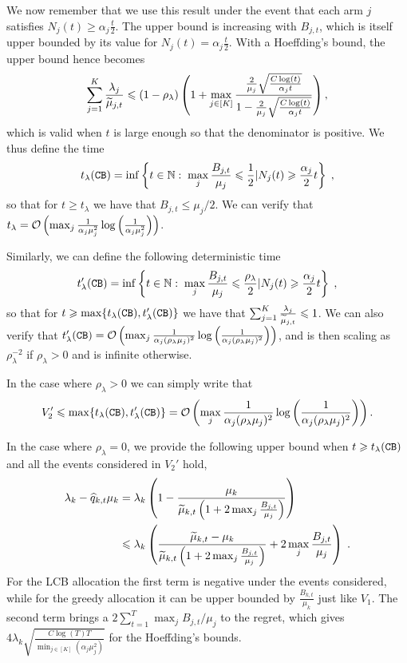 We now remember that we use this result under the event that each arm $j$ satisfies $N_j(t)\geq \alpha_j \frac{t}{2}$. The upper bound is increasing with $B_{j,t }$, which is itself upper bounded by its value for $N_j(t)= \alpha_j \frac{t}{2}$. With a Hoeffding's bound, the upper bound hence becomes 
\[\sum_{j=1}^K \frac{\lambda_j}{\widetilde{\mu}_{j, t}} \leqslant (1-\rho_\lambda)\left(1+ \max_{j\in[K]}\frac{\frac{2}{\mu_j}\sqrt{\frac{C\log(t)}{\alpha_j t}}}{1-\frac{2}{\mu_j}\sqrt{\frac{C\log(t)}{\alpha_j t}}} \right),\]
which is valid when $t$ is large enough so that the denominator is positive. We thus define the time \[t_\lambda(\texttt{CB})= \inf\left\{t \in \mathbb{N}: \; \max_j \frac{B_{j,t}}{\mu_j}\leqslant \frac{1}{2} | N_j(t)\geqslant \frac{\alpha_j}{2}t \right\}\;,\] so that for $t\geq t_\lambda$ we have that $B_{j,t}\leq \mu_j/2$. We can verify that $t_\lambda=\mathcal{O}\left(\max_j\frac{1}{\alpha_j\mu_j^2}\log\left(\frac{1}{\alpha_j\mu_j^2}\right)\right)$.

Similarly, we can define the following deterministic time
\[t_\lambda'(\texttt{CB})= \inf\left\{t \in \mathbb{N}: \; \max_j \frac{B_{j,t}}{\mu_j}\leqslant \frac{\rho_\lambda}{2} | N_j(t)\geqslant \frac{\alpha_j}{2}t \right\}\;,\] so that for $t\geqslant \max\{t_\lambda(\texttt{CB}), t_\lambda'(\texttt{CB})\}$ we have that $\sum_{j=1}^K \frac{\lambda_j}{\widetilde{\mu}_{j, t}} \leqslant 1$. We can also verify that $t_\lambda'(\texttt{CB})=\mathcal{O}\left(\max_j\frac{1}{\alpha_j(\rho_\lambda \mu_j)^2}\log\left(\frac{1}{\alpha_j(\rho_\lambda \mu_j)^2}\right)\right)$, and is then scaling as $\rho_\lambda^{-2}$ if $\rho_\lambda>0$ and is infinite otherwise.

In the case where $\rho_\lambda>0$ we can simply write that \[V_2' \leqslant \max\{t_\lambda(\texttt{CB}), t_\lambda'(\texttt{CB})\}= \mathcal{O}\left(\max_j\frac{1}{\alpha_j(\rho_\lambda\mu_j)^2}\log\left(\frac{1}{\alpha_j(\rho_\lambda\mu_j)^2}\right)\right).\]

In the case where $\rho_\lambda=0$, we provide the following upper bound when $t \geqslant t_\lambda(\texttt{CB})$ and all the events considered in $V_2'$ hold, 
\begin{align*}
\lambda_k - \widehat{q}_{k,t} \mu_k & = \lambda_k \left(1- \frac{\mu_k}{\widetilde{\mu}_{k, t}\left(1+2\max_j \frac{B_{j,t}}{\mu_j}\right)}\right) \\ 
& \leqslant \lambda_k \left(\frac{\widetilde{\mu}_{k,t}- \mu_k}{\widetilde{\mu}_{k, t}\left(1+2\max_j \frac{B_{j,t}}{\mu_j}\right)} +2\max_j \frac{B_{j,t}}{\mu_j} \right) \;.
\end{align*} 
For the LCB allocation the first term is negative under the events considered, while for the greedy allocation it can be upper bounded by $\frac{B_{k,t}}{\mu_k}$ just like $V_1$. The second term brings a $2\sum_{t=1}^T \max_j B_{j,t}/\mu_j$ to the regret, which gives $4\lambda_k\sqrt{\frac{C\log(T)T}{\min_{j \in [K]} (\alpha_j\mu_j^2)}}$ for the Hoeffding's bounds.

